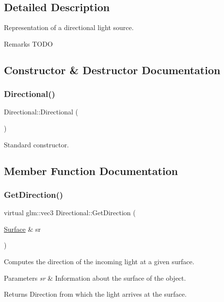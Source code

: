 \subsection{Detailed Description}
Representation of a directional light source. \begin{DoxyRemark}{Remarks}
T\+O\+DO 
\end{DoxyRemark}


\subsection{Constructor \& Destructor Documentation}
\hypertarget{class_directional_a3e88e0e393dbb8e57dbb7218c5d9f8c1}{}\label{class_directional_a3e88e0e393dbb8e57dbb7218c5d9f8c1} 
\subsubsection{\texorpdfstring{Directional()}{Directional()}}
{\footnotesize\ttfamily Directional\+::\+Directional (\begin{DoxyParamCaption}{ }\end{DoxyParamCaption})}

Standard constructor. 

\subsection{Member Function Documentation}
\hypertarget{class_directional_a022fc1cb35f0f760b5472c06ad6e2e74}{}\label{class_directional_a022fc1cb35f0f760b5472c06ad6e2e74} 
\subsubsection{\texorpdfstring{Get\+Direction()}{GetDirection()}}
{\footnotesize\ttfamily virtual glm\+::vec3 Directional\+::\+Get\+Direction (\begin{DoxyParamCaption}\item[{\hyperlink{class_surface}{Surface} \&}]{sr }\end{DoxyParamCaption})\hspace{0.3cm}{\ttfamily [virtual]}}

Computes the direction of the incoming light at a given surface. 
\begin{DoxyParams}{Parameters}
{\em sr} & Information about the surface of the object. \\
\hline
\end{DoxyParams}
\begin{DoxyReturn}{Returns}
Direction from which the light arrives at the surface. 
\end{DoxyReturn}


